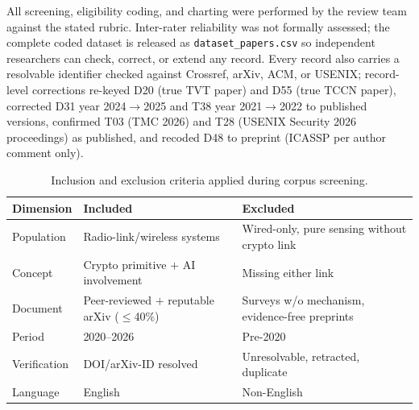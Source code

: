 \documentclass[11pt,a4paper]{article}
\begin{document}
All screening, eligibility coding, and charting were performed by the review team against the stated rubric. Inter-rater reliability was not formally assessed; the complete coded dataset is released as \texttt{dataset\_papers.csv} so independent researchers can check, correct, or extend any record. Every record also carries a resolvable identifier checked against Crossref, arXiv, ACM, or USENIX; record-level corrections re-keyed D20 (true TVT paper) and D55 (true TCCN paper), corrected D31 year 2024$\rightarrow$2025 and T38 year 2021$\rightarrow$2022 to published versions, confirmed T03 (TMC 2026) and T28 (USENIX Security 2026 proceedings) as published, and recoded D48 to preprint (ICASSP per author comment only).

\begin{table}[tbp]
\centering
\caption{Inclusion and exclusion criteria applied during corpus screening.}
\label{tab:criteria}
\begin{tabular}{@{}p{2.2cm} p{5.5cm} p{6.0cm}@{}}
\toprule
Dimension & Included & Excluded \\
\midrule
Population & Radio-link/wireless systems & Wired-only, pure sensing without crypto link \\
Concept & Crypto primitive $+$ AI involvement & Missing either link \\
Document & Peer-reviewed $+$ reputable arXiv ($\le$40\%) & Surveys w/o mechanism, evidence-free preprints \\
Period & 2020--2026 & Pre-2020 \\
Verification & DOI/arXiv-ID resolved & Unresolvable, retracted, duplicate \\
Language & English & Non-English \\
\bottomrule
\end{tabular}
\end{table}
\end{document}
